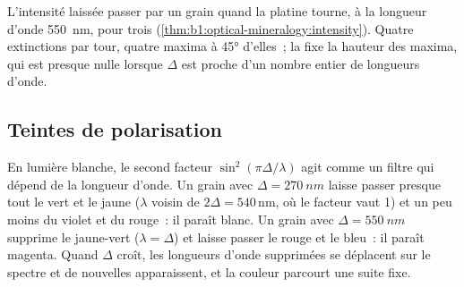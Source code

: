 \begin{omfigure}

{\small L'intensité laissée passer par un grain quand la platine tourne, à la
longueur d'onde \qty{550}{nm}, pour trois 
(\cref{thm:b1:optical-mineralogy:intensity}). Quatre extinctions par tour, quatre
maxima à \ang{45} d'elles~; la  fixe la hauteur des maxima,
qui est presque nulle lorsque $\Delta$ est proche d'un nombre entier de longueurs
d'onde.}
\end{omfigure}

\subsection{Teintes de polarisation}

En lumière blanche, le second facteur $\sin^2(\pi\Delta/\lambda)$ agit comme un
filtre qui dépend de la longueur d'onde. Un grain avec $\Delta = \qty{270}{nm}$
laisse passer presque tout le vert et le jaune ($\lambda$ voisin de
$2\Delta = 540$\,nm, où le facteur vaut 1) et un peu moins du violet et du rouge~:
il paraît blanc. Un grain avec $\Delta = \qty{550}{nm}$ supprime le jaune-vert
($\lambda = \Delta$) et laisse passer le rouge et le bleu~: il paraît magenta.
Quand $\Delta$ croît, les longueurs d'onde supprimées se déplacent sur le spectre
et de nouvelles apparaissent, et la couleur parcourt une suite fixe.

